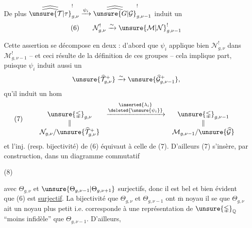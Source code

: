 De plus $\widehat{\widehat{\unsure{\mathcal T|\tau}}}_{g,\nu}^{!}\xrightarrow{\psi_i}\widehat{\widehat{\unsure{G|\mathcal G}}}_{g,\nu-1}^{!}$ induit un  
\[
(6)\qquad\mathcal N_{g,\nu}^{!}\xrightarrow{\sim}\unsure{\mathcal M|\mathcal N}_{g,\nu-1}^{!}
\]


Cette assertion se décompose en deux :  d'abord que $\psi_i$ applique bien $\mathcal N_{g,\nu}^{!}$ dans $\mathcal M_{g,\nu-1}^{!}$ -- et ceci résulte de la définition  de ces groupes -- cela implique  part, puisque $\psi_i$ induit aussi un  
\[
\unsure{\widehat{\mathcal T}_{g,\nu}^{+}}
\xrightarrow{\sim}
\unsure{\widehat{\mathcal G}_{g,\nu-1}^{+}},
\]
qu'il induit un hom
\[
(7)\qquad
\begin{array}{ccc}
\unsure{\mathbb{\Gamma}}_{g,\nu}
&\xrightarrow{\substack{\inserted{\lambda_i}\\\deleted{\unsure{\psi_i}}}}&
\unsure{\mathbb{\Gamma}}_{g,\nu-1}\\
\Vert&&\Vert\\
\mathcal N_{g,\nu}/\unsure{\widehat{\mathcal T}_{g,\nu}^{+}}
&&\mathcal M_{g,\nu-1}/\unsure{\widehat{\mathcal G}}
\end{array}
\]
et l'inj. (resp. bijectivité) de (6) équivaut à celle de (7). D'ailleurs (7) s'insère, par construction, dans un diagramme commutatif

(8)\quad{}

avec $\Theta_{g,\nu}$ et $\unsure{\Theta_{g,\nu-1}|\Theta_{g,\nu+1}}$ surjectifs, donc il est bel et bien évident que (6) est \uline{surjectif}. La bijectivité  que $\Theta_{g,\nu}$ et $\Theta_{g,\nu-1}$ ont $\overline{\mathrm m}$ noyau   il se  que $\Theta_{g,\nu}$ ait un noyau plus petit i.e. corresponde à une représentation de $\unsure{\mathbb{\Gamma}}_{\mathbb Q}$ ``moins infidèle'' que $\Theta_{g,\nu-1}$. D'ailleurs,

